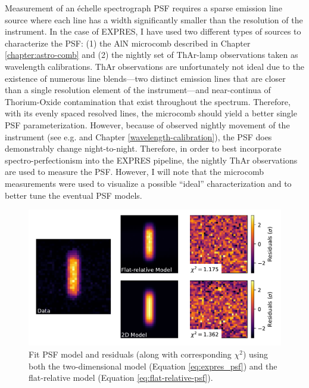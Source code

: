 Measurement of an \'{e}chelle spectrograph PSF requires a sparse emission line source where each line has a width significantly smaller than the resolution of the instrument. In the case of EXPRES, I have used two different types of sources to characterize the PSF: (1) the AlN microcomb described in Chapter \ref{chapter:astro-comb} and (2) the nightly set of ThAr-lamp observations taken as wavelength calibrations. ThAr observations are unfortunately not ideal due to the existence of numerous line blends---two distinct emission lines that are closer than a single resolution element of the instrument---and near-continua of Thorium-Oxide contamination that exist throughout the spectrum. Therefore, with its evenly spaced resolved lines, the microcomb should yield a better single PSF parameterization. However, because of observed nightly movement of the instrument (see e.g. \citet{blackman_performance_2020} and Chapter \ref{wavelength-calibration}), the PSF does demonstrably change night-to-night. Therefore, in order to best incorporate spectro-perfectionism into the EXPRES pipeline, the nightly ThAr observations are used to measure the PSF. However, I will note that the microcomb measurements were used to visualize a possible ``ideal'' characterization and to better tune the eventual PSF models.

\begin{figure}
    \centering
    \includegraphics[width=\textwidth]{figures-5/expres-psf.pdf}
    \caption{Fit PSF model and residuals (along with corresponding $\chi^2$) using both the two-dimensional model (Equation \ref{eq:expres_psf}) and the flat-relative model (Equation \ref{eq:flat-relative-psf}).}
    \label{fig:psf-resid}
\end{figure}

